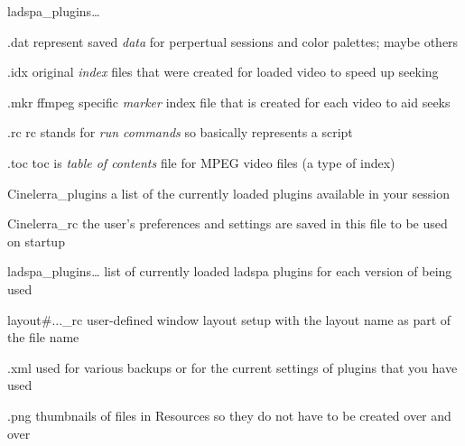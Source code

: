 \begin{labeling}{ladspa\_plugins{\dots}}
	\item [.dat] represent saved \textit{data} for perpertual sessions and color palettes; maybe others
	\item [.idx] original \textit{index} files that were created for loaded video to speed up seeking
	\item [.mkr] ffmpeg specific \textit{marker} index file that is created for each video to aid seeks
	\item [.rc] rc stands for \textit{run commands} so basically represents a script
	\item [.toc] toc is \textit{table of contents} file for MPEG video files (a type of index)
	\item [Cinelerra\_plugins] a list of the currently loaded plugins available in your \CGG{} session
	\item [Cinelerra{}\_rc] the user's preferences and settings are saved in this file to be used on startup
	\item [ladspa\_plugins{\dots}] list of currently loaded ladspa plugins for each version of \CGG{} being used
	\item [layout\#...\_rc] user-defined window layout setup with the layout name as part of the file name
	\item [.xml] used for various backups or for the current settings of plugins that you have used
	\item [.png] thumbnails of files in Resources so they do not have to be created over and over
\end{labeling}


